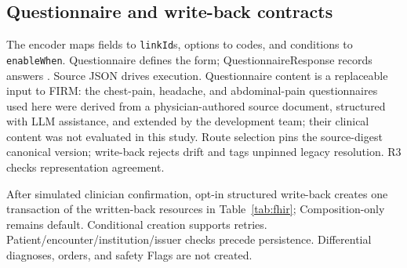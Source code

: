 \subsection{Questionnaire and write-back contracts}
The encoder maps fields to \texttt{linkId}s, options to codes, and conditions to
\texttt{enableWhen}. Questionnaire defines the form; QuestionnaireResponse records
answers \citep{fhirQuestionnaireR4,sdcIG}. Source JSON drives execution.
Questionnaire content is a replaceable input to FIRM: the chest-pain, headache, and
abdominal-pain questionnaires used here were derived from a physician-authored
source document, structured with LLM assistance, and extended by the development
team; their clinical content was not evaluated in this study. Route
selection pins the source-digest canonical version; write-back rejects drift and
tags unpinned legacy resolution. R3 checks representation agreement.

After simulated clinician confirmation, opt-in structured write-back creates
one transaction of the written-back resources in Table~\ref{tab:fhir};
Composition-only remains default. Conditional
creation supports retries. Patient/encounter/institution/issuer checks precede
persistence. Differential diagnoses, orders, and safety Flags are not created.

